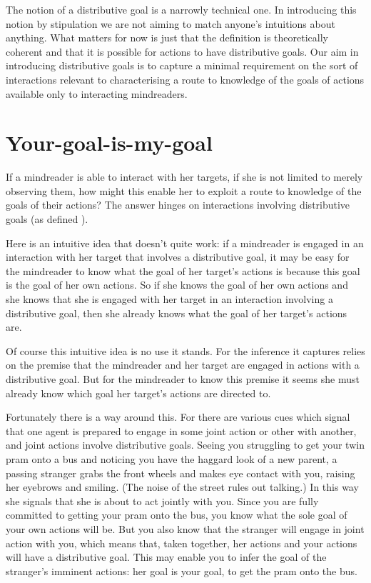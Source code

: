 \documentclass[12pt,\papersize]{extarticle}
\begin{document}
The notion of a distributive goal is a 
narrowly technical one.
In introducing this notion by stipulation we are not aiming to match anyone's intuitions about anything.
What matters for now is just that the definition is theoretically coherent and that it is possible for actions to have distributive goals.
Our aim in introducing distributive goals 
 is to capture a minimal requirement on the sort of interactions 
relevant to characterising a route to knowledge of the goals of actions
available only to interacting mindreaders.
% 


\section{Your-goal-is-my-goal}
\label{sec:your_goal_is_my_goal}
If a mindreader is able to interact with her targets,
if she is not limited to merely observing them,
how might this enable her to exploit a route to knowledge of the goals of their actions?
The answer hinges on interactions involving distributive goals
(as defined ).

Here is an intuitive idea that doesn't quite work:
if a mindreader is engaged in an interaction with her target that involves a distributive goal, 
it may be easy for the mindreader to know what the goal of her target's actions is because this goal is the goal of her own actions.
So if she knows the goal of her own actions and she knows that she is engaged with her target in an interaction involving a distributive goal,
then she already knows what the goal of her target's actions are.

Of course this intuitive idea is no use it stands.  
For the inference it captures relies on the premise that the mindreader and her target are engaged in actions with a distributive goal.
But for the mindreader to know this premise it seems she must   already know which goal her target's actions are directed to.

Fortunately there is a way around this.  
For there are various cues which signal that one agent is prepared to engage in some joint action or other with another,
and joint actions involve distributive goals.  
\label{twin_pram}
Seeing you struggling to get your twin pram onto a bus and noticing you have the haggard look of a new parent, a passing stranger  grabs the front wheels and makes eye contact with you, raising her eyebrows and smiling.
(The noise of the street rules out talking.)   
In this way she signals that she is about to act jointly with you.   
Since you are fully committed to getting your pram onto the bus,
you know what the sole goal of your own actions will be.
But you also know that the stranger will engage in joint action with you,
which means that, taken together, her actions and your actions will have a distributive goal.
This may enable you to infer the goal of the stranger's imminent actions: 
her goal is your goal, to get the pram onto the bus.
\end{document}

